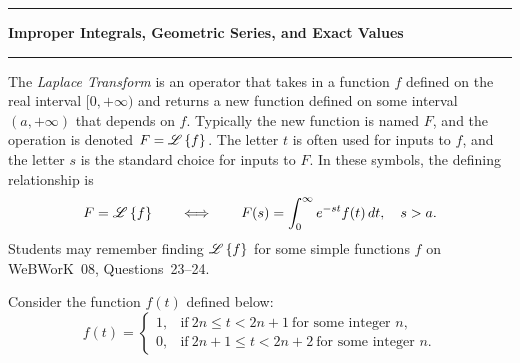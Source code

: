 \documentclass[answers]{exam}
\newcommand\starscore[2]{%
  \pgfmathsetmacro\pgfxa{#1 + 1}%
  \tikzstyle{scorestars}=[star, star points=5, star point ratio=2.5, draw, inner sep=0.12em, anchor=outer point 3]%
  \begin{tikzpicture}[baseline=2pt]
    \foreach \i in {1, ..., #2} {
      \pgfmathparse{\i<=#1 ? "black" : "white"}
      \edef\starcolor{\pgfmathresult}
      \draw (\i*1em, 0) node[name=star\i, scorestars, fill=\starcolor, semithick]  {};
    }
    \pgfmathparse{#1>int(#1) ? int(#1+1) : 0}
    \let\partstar=\pgfmathresult
    \ifnum\partstar>0
      \pgfmathsetmacro\starpart{#1-(int(#1)}
      \path [clip] ($(star\partstar.outer point 3)!(star\partstar.outer point 2)!(star\partstar.outer point 4)$) rectangle 
      ($(star\partstar.outer point 2 |- star\partstar.outer point 1)!\starpart!(star\partstar.outer point 1 -| star\partstar.outer point 5)$);
      \fill (\partstar*1em, 0) node[scorestars, fill=black]  {};
    \fi
  \end{tikzpicture}%
}
\newcommand{\Laplace}{\mathscr{L}}
\newcommand{\lr}[3]{\left#1{\mathstrut#3}\right#2}
\newcommand{\Set}[1]{\lr\lbrace\rbrace{#1}}
\begin{document}
\begin{questions}
\begin{EnvUplevel}
\hrule\smallskip
\noindent
\textbf{Improper Integrals, Geometric Series, and Exact Values}
\medskip\hrule\smallskip

The \emph{Laplace Transform} is an operator that takes in
a function $f$ defined on the real interval $[0,+\infty)$
and returns a new function defined on some interval $(a,+\infty)$
that depends on $f$.
Typically the new function is named $F$,
and the operation is denoted $F=\Laplace\Set{f}$.
The letter $t$ is often used for inputs to $f$,
and the letter $s$ is the standard choice for inputs to $F$.
In these symbols, the defining relationship is
\[
F = \Laplace\Set{f}
\qquad\Longleftrightarrow\qquad
F(s) = \int_0^\infty e^{-st} f(t)\,dt,\quad s>a.
\]
Students may remember finding $\Laplace\Set{f}$ for some
simple functions $f$ on WeBWorK~08, Questions~23--24.

\end{EnvUplevel}

\question\label{q:lt}%
Consider the function $f(t)$ defined below:
\[
f(t) = \begin{cases}
1, &\text{if}\ 2n\le t<2n+1\ \text{for some integer $n$},
\\
0, &\text{if}\ 2n+1\le t<2n+2\ \text{for some integer $n$}.
\end{cases}
\]
\end{questions}
\end{document}
